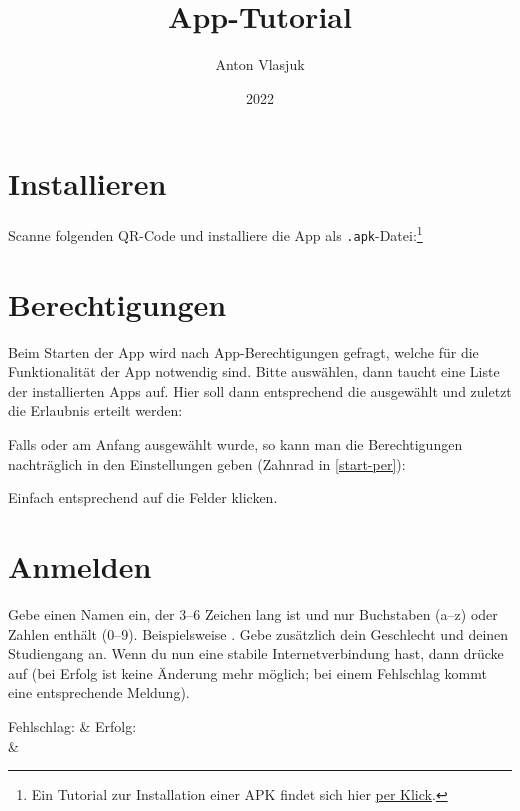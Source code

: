 \documentclass[ngerman]{tutorial}
\title{App-Tutorial}
\author{Anton Vlasjuk}
\date{2022}
\begin{document}
\maketitle
\tableofcontents
\bigskip\vfill

\section{Installieren}
Scanne folgenden QR-Code und installiere die App als \texttt{.apk}-Datei:\footnote{Ein Tutorial zur Installation einer APK findet sich hier \href{https://www.heise.de/tipps-tricks/Externe-Apps-APK-Dateien-bei-Android-installieren-so-klappt-s-3714330.html}{per Klick}.}
\vfill
\begin{center}
\end{center}
\vfill
\clearpage

\section{Berechtigungen}
%
Beim Starten der App wird nach App-Berechtigungen gefragt, welche für die Funktionalität der App notwendig sind.
Bitte  auswählen, dann taucht eine Liste der installierten Apps auf. Hier soll dann entsprechend die  ausgewählt und zuletzt die Erlaubnis erteilt werden:
\begin{center}
    \quad{}\quad{}
\end{center}

Falls  oder  am Anfang ausgewählt wurde, so kann man die Berechtigungen nachträglich in den Einstellungen geben (Zahnrad in \autoref{start-per}):
\begin{center}
\end{center}
Einfach entsprechend auf die Felder klicken.



\clearpage
\section{Anmelden}
Gebe einen Namen ein, der 3--6 Zeichen lang ist und nur Buchstaben (a--z) oder Zahlen enthält (0--9). Beispielsweise . Gebe zusätzlich dein Geschlecht und deinen Studiengang an. Wenn du nun eine stabile Internetverbindung hast, dann drücke auf  (bei Erfolg ist keine Änderung mehr möglich; bei einem Fehlschlag kommt eine entsprechende Meldung).
\begin{center}
        Fehlschlag: & Erfolg: \\
         & 
    \endtabular
\end{center}
\end{document}

